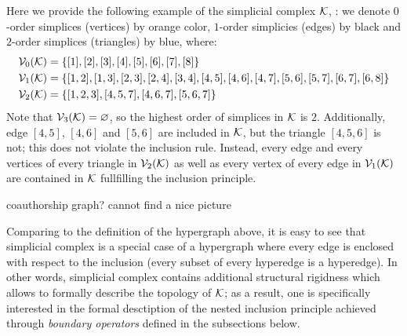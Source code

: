 \begin{example}

      Here we provide the following example of the simplicial complex \( \mathcal{K} \), : we denote \(0\)-order simplices (vertices) by orange color, \( 1\)-order simplicies (edges) by black and \( 2\)-order simplices (triangles) by blue, where: 
      \begin{equation}
            \begin{aligned}
                  \mathcal{V}_{0}(\mathcal{K}) & = \{ [1], [2], [3], [4], [5], [6], [7], [8] \} \\
                  \mathcal{V}_{1}(\mathcal{K}) & = \{ [1, 2], [1, 3], [2, 3], [2, 4], [3, 4], [4, 5], [4, 6], [4, 7], [5, 6], [5, 7], [6, 7], [6, 8] \} \\
                  \mathcal{V}_{2}(\mathcal{K}) & = \{ [ 1, 2, 3 ], [4, 5, 7], [4, 6, 7], [5, 6, 7] \}
            \end{aligned}
      \end{equation}
      Note that \( \mathcal{V}_{3}(\mathcal{K}) = \varnothing \), so the highest order of simplices in \( \mathcal{K} \) is \( 2 \). Additionally, edge \( [4, 5] \), \( [4, 6]\) and \( [5, 6]\) are included in \( \mathcal{K} \), but the triangle \( [4, 5, 6]\) is not; this does not violate the inclusion rule. Instead, every edge and every vertices of every triangle in \( \mathcal{V}_{2}(\mathcal{K}) \) as well as every vertex of every edge in \( \mathcal{V}_{1}(\mathcal{K}) \) are contained in \( \mathcal{K} \) fullfilling the inclusion principle.
\end{example}

\begin{example}

      coauthorship graph? cannot find a nice picture

      
\end{example}


Comparing to the definition of the hypergraph above, it is easy to see that simplicial complex is a special case of a hypergraph where every edge is enclosed with respect to the inclusion (every subset of every hyperedge is a hyperedge). In other words, simplicial complex contains additional structural rigidness which allows to formally describe the topology of \( \mathcal{K} \); as a result, one is specifically interested in the formal desctiption of the nested inclusion principle achieved through \emph{boundary operators} defined in the subsections below.


